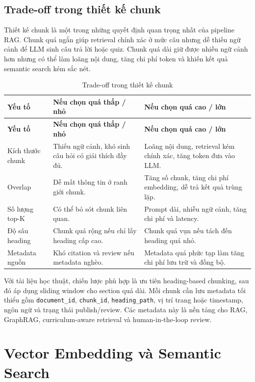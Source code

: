 \subsection{Trade-off trong thiết kế chunk}
\label{subsec:tradeoff-thiet-ke-chunk}

Thiết kế chunk là một trong những quyết định quan trọng nhất của pipeline RAG.
Chunk quá ngắn giúp retrieval chính xác ở mức câu nhưng dễ thiếu ngữ cảnh để
LLM sinh câu trả lời hoặc quiz. Chunk quá dài giữ được nhiều ngữ cảnh hơn nhưng
có thể làm loãng nội dung, tăng chi phí token và khiến kết quả semantic search
kém sắc nét.

\begin{longtable}{|p{3cm}|p{4.2cm}|p{6.8cm}|}
\caption{Trade-off trong thiết kế chunk}
\label{tab:chunking-tradeoff}\\
\hline
\textbf{Yếu tố} & \textbf{Nếu chọn quá thấp / nhỏ} & \textbf{Nếu chọn quá cao / lớn} \\
\hline
\endfirsthead
\hline
\textbf{Yếu tố} & \textbf{Nếu chọn quá thấp / nhỏ} & \textbf{Nếu chọn quá cao / lớn} \\
\hline
\endhead
Kích thước chunk & Thiếu ngữ cảnh, khó sinh câu hỏi có giải thích đầy đủ. & Loãng nội dung, retrieval kém chính xác, tăng token đưa vào LLM. \\
\hline
Overlap & Dễ mất thông tin ở ranh giới chunk. & Tăng số chunk, tăng chi phí embedding, dễ trả kết quả trùng lặp. \\
\hline
Số lượng top-K & Có thể bỏ sót chunk liên quan. & Prompt dài, nhiễu ngữ cảnh, tăng chi phí và latency. \\
\hline
Độ sâu heading & Chunk quá rộng nếu chỉ lấy heading cấp cao. & Chunk quá vụn nếu tách đến heading quá nhỏ. \\
\hline
Metadata nguồn & Khó citation và review nếu metadata nghèo. & Metadata quá phức tạp làm tăng chi phí lưu trữ và đồng bộ. \\
\hline
\end{longtable}

Với tài liệu học thuật, chiến lược phù hợp là ưu tiên heading-based chunking,
sau đó áp dụng sliding window cho section quá dài. Mỗi chunk cần lưu metadata
tối thiểu gồm \texttt{document\_id}, \texttt{chunk\_id},
\texttt{heading\_path}, vị trí trang hoặc timestamp, ngôn ngữ và trạng thái
publish/review. Các metadata này là nền tảng cho RAG, GraphRAG,
curriculum-aware retrieval và human-in-the-loop review.


\section{Vector Embedding và Semantic Search}
\label{sec:vector-embedding-semantic-search}

